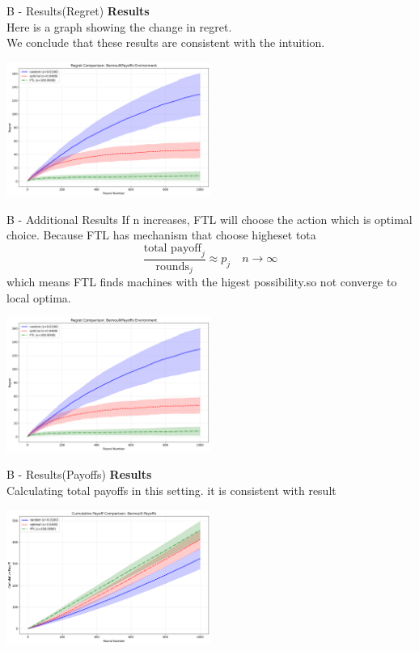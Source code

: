 \documentclass{beamer}
\begin{document}
\begin{frame}{B - Results(Regret)}
\textbf{Results}\\
Here is a graph showing the change in regret. \\
We conclude that these results are consistent with the intuition. \\
\begin{center}
    \includegraphics[width=0.5\textwidth]{../figures/bernoulli_regret_comparison.png}
\end{center}
\end{frame}

\begin{frame}{B - Additional Results}
If n increases,  FTL will choose the action which is  optimal choice.
Because FTL has mechanism that choose higheset tota
\[
\frac{\text{total payoff}_j}{\text{rounds}_j} \approx p_j \quad n \rightarrow\infty
\]
which means FTL finds machines with the higest possibility.so not converge to local optima.
\begin{center}
    \includegraphics[width=0.5\textwidth]{../figures/bernoulli_regret_comparison.png}
\end{center}
\end{frame}

\begin{frame}{B - Results(Payoffs)}
\textbf{Results}\\
Calculating total payoffs in this setting. it is consistent with result
\begin{center}
    \includegraphics[width=0.5\textwidth]{figures/BP_payoff.png}
\end{center}
\end{frame}
\end{document}
